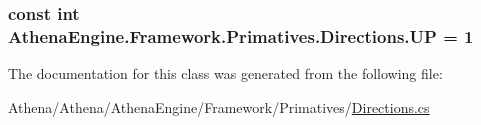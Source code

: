 \hypertarget{class_athena_engine_1_1_framework_1_1_primatives_1_1_directions_a1254ff22dcb4f165ad3f99f173230266}{
\subsubsection[{U\-P}]{\setlength{\rightskip}{0pt plus 5cm}const int Athena\-Engine.\-Framework.\-Primatives.\-Directions.\-U\-P = 1}}\label{class_athena_engine_1_1_framework_1_1_primatives_1_1_directions_a1254ff22dcb4f165ad3f99f173230266}


The documentation for this class was generated from the following file\-:\begin{DoxyCompactItemize}
\item 
Athena/\-Athena/\-Athena\-Engine/\-Framework/\-Primatives/\hyperlink{_directions_8cs}{Directions.\-cs}\end{DoxyCompactItemize}
